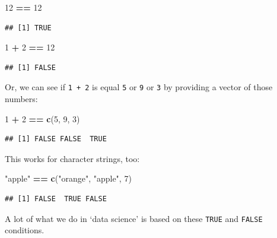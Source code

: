 \documentclass[]{book}
\newenvironment{Shaded}{\begin{snugshade}}{\end{snugshade}}
\newcommand{\DecValTok}[1]{\textcolor[rgb]{0.00,0.00,0.81}{#1}}
\newcommand{\KeywordTok}[1]{\textcolor[rgb]{0.13,0.29,0.53}{\textbf{#1}}}
\newcommand{\NormalTok}[1]{#1}
\newcommand{\OperatorTok}[1]{\textcolor[rgb]{0.81,0.36,0.00}{\textbf{#1}}}
\newcommand{\StringTok}[1]{\textcolor[rgb]{0.31,0.60,0.02}{#1}}
\begin{document}
\begin{Shaded}
\begin{Highlighting}[]
\DecValTok{12} \OperatorTok{==}\StringTok{ }\DecValTok{12}
\end{Highlighting}
\end{Shaded}

\begin{verbatim}
## [1] TRUE
\end{verbatim}

\begin{Shaded}
\begin{Highlighting}[]
\DecValTok{1} \OperatorTok{+}\StringTok{ }\DecValTok{2} \OperatorTok{==}\StringTok{ }\DecValTok{12}
\end{Highlighting}
\end{Shaded}

\begin{verbatim}
## [1] FALSE
\end{verbatim}

Or, we can see if \texttt{1\ +\ 2} is equal \texttt{5} or \texttt{9} or \texttt{3} by providing a vector of those numbers:

\begin{Shaded}
\begin{Highlighting}[]
\DecValTok{1} \OperatorTok{+}\StringTok{ }\DecValTok{2} \OperatorTok{==}\StringTok{ }\KeywordTok{c}\NormalTok{(}\DecValTok{5}\NormalTok{, }\DecValTok{9}\NormalTok{, }\DecValTok{3}\NormalTok{)}
\end{Highlighting}
\end{Shaded}

\begin{verbatim}
## [1] FALSE FALSE  TRUE
\end{verbatim}

This works for character strings, too:

\begin{Shaded}
\begin{Highlighting}[]
\StringTok{"apple"} \OperatorTok{==}\StringTok{ }\KeywordTok{c}\NormalTok{(}\StringTok{"orange"}\NormalTok{, }\StringTok{"apple"}\NormalTok{, }\DecValTok{7}\NormalTok{)}
\end{Highlighting}
\end{Shaded}

\begin{verbatim}
## [1] FALSE  TRUE FALSE
\end{verbatim}

A lot of what we do in `data science' is based on these \texttt{TRUE} and \texttt{FALSE} conditions.
\end{document}
